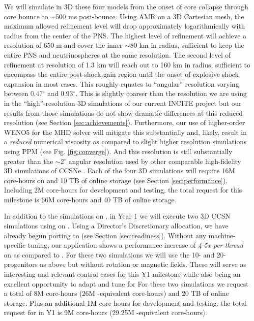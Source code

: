 We will simulate in 3D these four models from the onset of core collapse through core bounce to $\sim$500 ms post-bounce.
Using AMR on a 3D Cartesian mesh, the maximum allowed refinement level will drop approximately logarithmically with radius from the center of the PNS.
The highest level of refinement will achieve a resolution of 650 m and cover the inner $\sim$80 km in radius, sufficient to keep the entire PNS and neutrinospheres at the same resolution.
The second level of refinement at resolution of 1.3 km will reach out to 160 km in radius, sufficient to encompass the entire post-shock gain region until the onset of explosive shock expansion in most cases.
This roughly equates to ``angular'' resolution varying between 0.47$^\circ$ and  0.93$^\circ$.
This is slightly coarser than the resolution we are using in the ``high''-resolution 3D simulations of our current INCITE project but our results from those simulations do not show dramatic differences at this reduced resolution (see Section \ref{sec:achievements}).
Furthermore, our use of higher-order WENO5 for the MHD solver will mitigate this substantially and, likely, result in a {\it reduced} numerical viscosity as compared to slight higher resolution simulations using PPM (see Fig. \ref{fig:converge}).
And this resolution is still substantially greater than the $\sim$2$^\circ$ angular resolution used by other comparable high-fidelity 3D simulations of CCSNe \citep[e.g.,][]{Melson:2015, Lentz:2015, Janka:2016}.
Each of the four 3D simulations will require 16M core-hours on \mira and 10 TB of online storage (see Section \ref{sec:performance}).
Including 2M \mira core-hours for development and testing, the total request for this milestone is 66M \mira core-hours and 40 TB of online storage.

In addition to the simulations on \mira, in Year 1 we will execute two 3D CCSN simulations using \sparkmone on \thet.
Using a Director's Discretionary allocation, we have already begun porting \sparkmone to \thet (see Section \ref{sec:readiness}).
Without any machine-specific tuning, our \sparkmone application shows a performance increase of {\it 4-5x per thread} on \thet as compared to \mira.
For these two simulations we will use the 10- and 20-\msun progenitors as above but without rotation or magnetic fields.
These will serve as interesting and relevant control cases for this Y1 milestone while also being an excellent opportunity to adapt and tune \sparkmone for \thet
For these two simulations we request a total of 8M \thet core-hours (26M \mira-equivalent core-hours) and 20 TB of online storage.
Plus an additional 1M \thet core-hours for development and testing, the total request for \thet in Y1 is 9M core-hours (29.25M \mira-equivalent core-hours).


